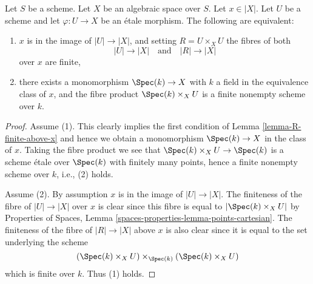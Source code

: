 \begin{lemma}
\label{lemma-weak-UR-finite-above-x}
Let $S$ be a scheme. Let $X$ be an algebraic space over $S$.
Let $x \in |X|$.
Let $U$ be a scheme and let $\varphi : U \to X$ be an \'etale morphism.
The following are equivalent:
\begin{enumerate}
\item $x$ is in the image of $|U| \to |X|$, and
setting $R = U \times_X U$ the fibres of both
$$
|U| \longrightarrow |X|
\quad\text{and}\quad
|R| \longrightarrow |X|
$$
over $x$ are finite,
\item there exists a monomorphism $\Spec(k) \to X$ with $k$ a field
in the equivalence class of $x$, and
the fibre product $\Spec(k) \times_X U$ is
a finite nonempty scheme over $k$.
\end{enumerate}
\end{lemma}

\begin{proof}
Assume (1). This clearly implies the first condition of
Lemma \ref{lemma-R-finite-above-x} and hence we obtain a monomorphism
$\Spec(k) \to X$ in the class of $x$. Taking the fibre product
we see that $\Spec(k) \times_X U \to \Spec(k)$ is a scheme
\'etale over $\Spec(k)$ with finitely many points, hence a finite
nonempty scheme over $k$, i.e., (2) holds.

\medskip\noindent
Assume (2). By assumption $x$ is in the image of
$|U| \to |X|$. The finiteness of the fibre of
$|U| \to |X|$ over $x$ is clear since this fibre is equal to
$|\Spec(k) \times_X U|$ by
Properties of Spaces,
Lemma \ref{spaces-properties-lemma-points-cartesian}.
The finiteness of the fibre of $|R| \to |X|$ above $x$ is also clear
since it is equal to the set underlying the scheme
$$
(\Spec(k) \times_X U) \times_{\Spec(k)} (\Spec(k) \times_X U)
$$
which is finite over $k$. Thus (1) holds.
\end{proof}

